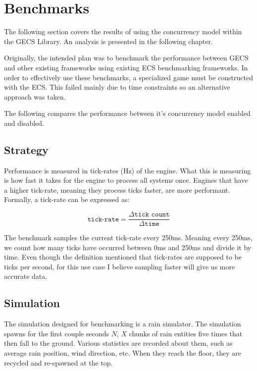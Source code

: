 \section{Benchmarks}
The following section covers the results of using the concurrency model within the GECS Library. An analysis is presented in the following chapter.

Originally, the intended plan was to benchmark the performance between GECS and other existing frameworks using existing ECS benchmarking frameworks. In order to effectively use these benchmarks, a specialized game must be constructed with the ECS. This failed mainly due to time constraints so an alternative approach was taken. 

The following compares the performance between it's concurrency model enabled and disabled. 

\subsection{Strategy}
Performance is measured in tick-rates (Hz) of the engine. What this is measuring is how fast it takes for the engine to process all systems once. Engines that have a higher tick-rate, meaning they process ticks faster, are more performant. Formally, a tick-rate can be expressed as:

$$
\texttt{tick-rate} = \frac{\Delta\texttt{tick count}}{\Delta\texttt{time}}
$$

The benchmark samples the current tick-rate every 250ms. Meaning every 250ms, we count how many ticks have occurred between 0ms and 250ms and divide it by time. Even though the definition mentioned that tick-rates are supposed to be ticks per second, for this use case I believe sampling faster will give us more accurate data. 

\subsection{Simulation}
The simulation designed for benchmarking is a rain simulator. The simulation spawns for the first couple seconds $N$, $X$ chunks of rain entities five times that then fall to the ground. Various statistics are recorded about them, such as average rain position, wind direction, etc. When they reach the floor, they are recycled and re-spawned at the top.

